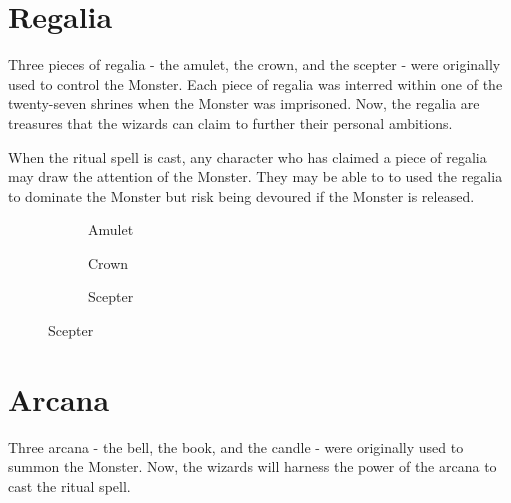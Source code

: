 \documentclass[10pt, parskip=half-, twoside]{scrartcl}
\begin{document}
\section*{Regalia}
Three pieces of regalia - the amulet, the crown, and the scepter - were originally used to control the Monster. Each piece of regalia was interred within one of the twenty-seven shrines when the Monster was imprisoned. Now, the regalia are treasures that the wizards can claim to further their personal ambitions.

When the ritual spell is cast, any character who has claimed a piece of regalia may draw the attention of the Monster. They may be able to to used the regalia to dominate the Monster but risk being devoured if the Monster is released.
\vfill
\begin{figure}[hb]
\centering
\begin{subfigure}{0.3\textwidth}
\centering
{}
\caption*{Amulet}
\end{subfigure}
\hfill
\begin{subfigure}{0.3\textwidth}
\centering
{}
\caption*{Crown}
\end{subfigure}
\hfill
\begin{subfigure}{0.3\textwidth}
\centering
{}
\caption*{Scepter}
\end{subfigure}
\end{figure}

\newpage

\section*{Arcana}
Three arcana - the bell, the book, and the candle - were originally used to summon the Monster. Now, the wizards will harness the power of the arcana to cast the ritual spell.
\end{document}
